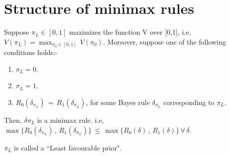 \documentclass[12pt]{report}
\begin{document}
\section{Structure of minimax rules}
\begin{thm}\label{thm minimax rules}

Suppose $\pi_L \in [0,1]$ maximizes the function V over [0,1], i.e, $V(\pi_L)=\displaystyle{ \max_{\pi_0\in [0,1]}} \, V(\pi_0)$. Moreover, suppose one of the following conditions holds:-
\begin{enumerate}
\item $\pi_L=0$.
\item $\pi_L=1$.
\item $R_0({\delta_{\pi_L}}) \, = \,R_1({\delta_{\pi_L}})$, for some Bayes rule $\delta_{\pi_L}$ corresponding to $\pi_L$.
\end{enumerate}
Then, $\delta{\pi_L}$ is a minimax rule.
i.e, $\max \{R_0({\delta_{\pi_L}}) \, , \,R_1({\delta_{\pi_L}})\} \, \leq \, \max \{R_0(\delta) \, , \, R_1(\delta) \} \, \forall \, \delta$.
\end{thm}

\begin{rem}

 $\pi_L$ is called a ``Least favourable prior". 

\end{rem}
\end{document}
